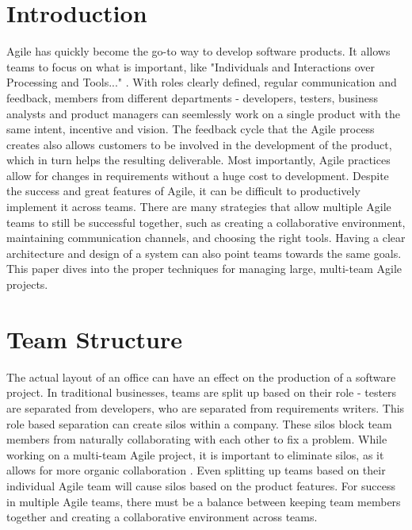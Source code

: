 \documentclass[sigplan,screen]{acmart}
\begin{document}
\section{Introduction}
Agile has quickly become the go-to way to develop software products.
It allows teams to focus on what is important, like "Individuals and Interactions over Processing and Tools..." \cite{b3}. 
With roles clearly defined, regular communication and feedback, members from different departments - developers, testers, business analysts and product managers can seemlessly work on a single product with the same intent, incentive and vision.
The feedback cycle that the Agile process creates also allows customers to be involved in the development of the product, which in turn helps the resulting deliverable.
Most importantly, Agile practices allow for changes in requirements without a huge cost to development.
Despite the success and great features of Agile, it can be difficult to productively implement it across teams.
There are many strategies that allow multiple Agile teams to still be successful together, such as creating a collaborative environment, maintaining communication channels, and choosing the right tools.
Having a clear architecture and design of a system can also point teams towards the same goals.
This paper dives into the proper techniques for managing large, multi-team Agile projects.

 
\section{Team Structure}
The actual layout of an office can have an effect on the production of a software project.
In traditional businesses, teams are split up based on their role - testers are separated from developers, who are separated from requirements writers.
This role based separation can create silos within a company. 
These silos block team members from naturally collaborating with each other to fix a problem.
While working on a multi-team Agile project, it is important to eliminate silos, as it allows for more organic collaboration \cite{b1}.
Even splitting up teams based on their individual Agile team will cause silos based on the product features.
For success in multiple Agile teams, there must be a balance between keeping team members together and creating a collaborative environment across teams.
\end{document}
